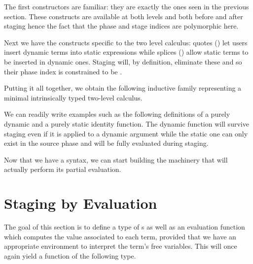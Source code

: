The first constructors are familiar: they are exactly the ones
seen in the previous section. These constructs are available
at both levels and both before and after staging hence the fact
that the phase and stage indices are polymorphic here.


Next we have the constructs specific to the two level calculus:
quotes () let users insert dynamic terms into static
expressions while splices () allow static terms to
be inserted in dynamic ones.
%
Staging will, by definition, eliminate these and so their phase
index is constrained to be .



Putting it all together, we obtain the following inductive
family representing a minimal intrinsically typed two-level
calculus.

\begin{AgdaAlign}
  \begin{AgdaSuppressSpace}
  \end{AgdaSuppressSpace}
\end{AgdaAlign}

We can readily write examples such as the following definitions
of a purely dynamic and a purely static identity function. The
dynamic function will survive staging even if it is applied to a
dynamic argument while the static one can only exist in the
source phase and will be fully evaluated during staging.

\noindent
\begin{minipage}{.21\textwidth}
\end{minipage}\hfill
\begin{minipage}{.23\textwidth}
\end{minipage}

Now that we have a syntax, we can start building the machinery
that will actually perform its partial evaluation.

\section{Staging by Evaluation}

The goal of this section is to define a type of s
as well as an evaluation function which computes the
value associated to each term, provided that we have an
appropriate environment to interpret the term's free variables.
%
This will once again yield a function  of the following type.

